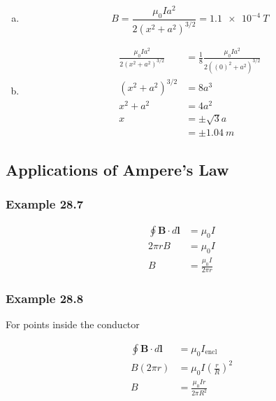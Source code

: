 \documentclass{article}
\begin{document}
\begin{enumerate}[(a)]
  \item \[B = \frac{\mu_0 I a^2}{2 \left( x^2 + a^2 \right)^{3/2}} = \qty{1.1e-4}{T}\]

  \item

        \begin{align*}
          \frac{\mu_0 I a^2}{2 \left( x^2 + a^2 \right)^{3/2}} & = \frac{1}{8} \frac{\mu_0 I a^2}{2 \left( (0)^2 + a^2 \right)^{3/2}} \\
          \left( x^2 + a^2 \right)^{3/2}                       & = 8 a^3                                                              \\
          x^2 + a^2                                            & = 4 a^2                                                              \\
          x                                                    & = \pm \sqrt{3} a                                                     \\
                                                               & = \pm \qty{1.04}{m}
        \end{align*}
\end{enumerate}

\setcounter{subsection}{6}
\subsection{Applications of Ampere's Law}

\subsubsection{Example 28.7}

\begin{align*}
  \oint \mathbf{B} \cdot d\mathbf{l} & = \mu_0 I                 \\
  2 \pi r B                          & = \mu_0 I                 \\
  B                                  & = \frac{\mu_0 I}{2 \pi r}
\end{align*}

\subsubsection{Example 28.8}

For points inside the conductor

\begin{align*}
  \oint \mathbf{B} \cdot d\mathbf{l} & = \mu_0 I_\textrm{encl}                \\
  B (2 \pi r)                        & = \mu_0 I \left( \frac{r}{R} \right)^2 \\
  B                                  & = \frac{\mu_0 I r}{2 \pi R^2}
\end{align*}
\end{document}
